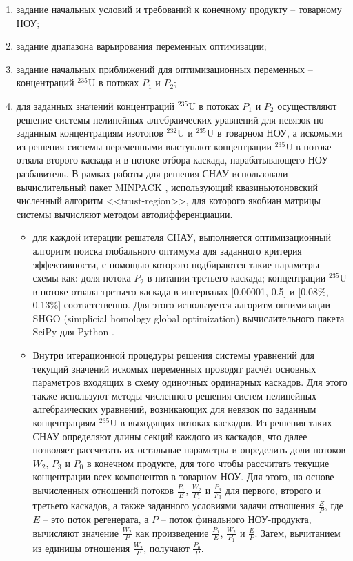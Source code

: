 \begin{enumerate}
    \item задание начальных условий и требований к конечному продукту -- товарному НОУ;
    \item задание диапазона варьирования переменных оптимизации;    
    \item задание начальных приближений для оптимизационных переменных -- концентраций $^{235}$U в потоках $P_1$ и $P_2$;
    \item для заданных значений концентраций $^{235}$U в потоках $P_1$ и $P_2$ осуществляют решение системы нелинейных алгебраических уравнений для невязок по заданным концентрациям изотопов $^{232}$U и $^{235}$U в товарном НОУ, а искомыми из решения системы переменными выступают концентрации $^{235}$U в потоке отвала второго каскада и в потоке отбора каскада, нарабатывающего НОУ-разбавитель. В рамках работы для решения СНАУ использовали вычислительный пакет MINPACK \cite{moreMINPACK}, использующий квазиньютоновский численный алгоритм <<trust-region>>, для которого якобиан матрицы системы вычисляют методом автодифференциации.
        \begin{itemize}
        \item для каждой итерации решателя СНАУ, выполняется оптимизационный алгоритм поиска глобального оптимума для заданного критерия эффективности, с помощью которого подбираются такие параметры схемы как: доля потока $P_2$ в питании третьего каскада; концентрации $^{235}$U в потоке отвала третьего каскада в интервалах [0.00001, 0.5] и [0.08\%, 0.13\%] соответственно. Для этого используется алгоритм оптимизации SHGO (simplicial homology global optimization) вычислительного пакета SciPy для Python  \cite{virtanenSciPyFundamentalAlgorithms2020a}.
        
        \item Внутри итерационной процедуры решения системы уравнений для текущий значений искомых переменных проводят расчёт основных параметров входящих в схему одиночных ординарных каскадов. Для этого также используют методы численного решения систем нелинейных алгебраических уравнений, возникающих для невязок по заданным концентрациям $^{235}$U в выходящих потоках каскадов. Из решения таких СНАУ определяют длины секций каждого из каскадов, что далее позволяет рассчитать их остальные параметры и определить доли потоков $W_2$, $P_3$  и $P_0$ в конечном продукте, для того чтобы рассчитать текущие концентрации всех компонентов в товарном НОУ. Для этого, на основе вычисленных отношений потоков $\frac{P_{1}}{E}$, $\frac{W_{2}}{P_{1}}$ и $\frac{P_{3}}{F_{3}}$ для первого, второго и третьего каскадов, а также заданного условиями задачи отношения $\frac{E}{P}$, где $E$ -- это поток регенерата, а $P$ -- поток финального НОУ-продукта, вычисляют значение $\frac{W_{2}}{P}$ как произведение $\frac{P_{1}}{E}$, $\frac{W_{2}}{P_{1}}$ и $\frac{E}{P}$. Затем, вычитанием из единицы отношения $\frac{W_{2}}{P}$, получают $\frac{P_{0}}{P}$.
        

\end{itemize}
\end{enumerate}
